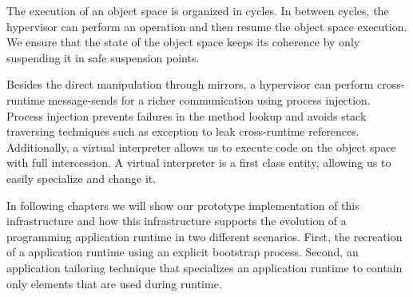 The execution of an object space is organized in cycles. In between cycles, the hypervisor can perform an operation and then resume the object space execution. We ensure that the state of the object space keeps its coherence by only suspending it in safe suspension points.

Besides the direct manipulation through mirrors, a hypervisor can perform cross-runtime message-sends for a richer communication using process injection. Process injection prevents failures in the method lookup and avoids stack traversing techniques such as exception to leak cross-runtime references. Additionally, a virtual interpreter allows us to execute code on the object space with full intercession. A virtual interpreter is a first class entity, allowing us to easily specialize and change it.

In following chapters we will show our prototype implementation of this infrastructure and how this infrastructure supports the evolution of a programming application runtime in two different scenarios. First, the recreation of a application runtime using an explicit bootstrap process. Second, an application tailoring technique that specializes an application runtime to contain only elements that are used during runtime.

